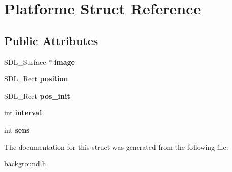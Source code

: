 \hypertarget{structPlatforme}{}\section{Platforme Struct Reference}
\label{structPlatforme}
\subsection*{Public Attributes}
\begin{DoxyCompactItemize}
\item 
\mbox{\label{structPlatforme_a1fededad065363039bf9a5969a52819e}} 
S\+D\+L\+\_\+\+Surface $\ast$ {\bfseries image}
\item 
\mbox{\label{structPlatforme_af2c9e89d1a8db9aecbfac2ca8a248407}} 
S\+D\+L\+\_\+\+Rect {\bfseries position}
\item 
\mbox{\label{structPlatforme_a7a50d184a18f9572aee7d2ff3e4ec6ca}} 
S\+D\+L\+\_\+\+Rect {\bfseries pos\+\_\+init}
\item 
\mbox{\label{structPlatforme_a254e58d9278e4a6ec01de25009e86d1b}} 
int {\bfseries interval}
\item 
\mbox{\label{structPlatforme_a7ad73bffce8c77d18d617513f5fc90a9}} 
int {\bfseries sens}
\end{DoxyCompactItemize}


The documentation for this struct was generated from the following file\+:\begin{DoxyCompactItemize}
\item 
background.\+h\end{DoxyCompactItemize}
